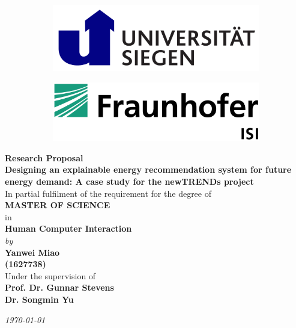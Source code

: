 \begin{titlepage}

\begin{center}

\vspace*{-1cm}

\begin{figure}[h]
  \begin{subfigure}{0.50\textwidth}
    \includegraphics[width=0.8\linewidth, left]{Images/siegen.png}
  \end{subfigure}
  \begin{subfigure}{0.49\textwidth}
    \includegraphics[width=0.8\linewidth, right]{Images/isi.jpeg}
  \end{subfigure}
\end{figure}

\vfill

\textbf{\large Research Proposal}\\[10pt]
{\Large \bf Designing an explainable energy recommendation system for future energy demand: A case study for the newTRENDs project}\\

\vfill
In partial fulfilment of the requirement for the degree of\\
{\large \bf MASTER OF SCIENCE}\\
in\\ 
{\large \bf Human Computer Interaction } \\
{\em  by} \\
{\large \bf Yanwei Miao} \\
{\large \bf (1627738)}\\

Under the supervision of \\
{\bf\large Prof. Dr. Gunnar Stevens} \\
{\bf\large Dr. Songmin Yu} \\

\vfill

{\it\large \today}

\end{center}

\end{titlepage}

\clearpage